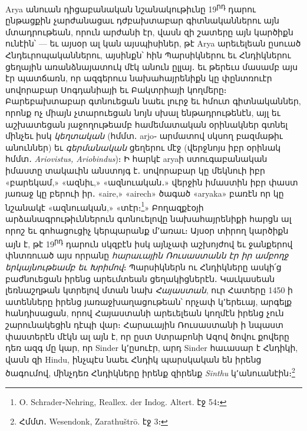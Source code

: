 \documentclass{article}
\begin{document}
{Arya անուան դիցաբանական նշանակութիւնը 19\textsuperscript{րդ} դարու ընթացքին չարժանացաւ դժբախտաբար գիտնականներու այն մտադրութեան, որուն արժանի էր, վասն զի շատերը այն կարծիքն ունէին՝ — եւ այսօր ալ կան այսպիսիներ, թէ Arya արեւելեան ըսուած Հնդեւրոպականներու, այսինքն՝ հին Պարսիկներու եւ Հնդիկներու ցեղային առանձնայատուկ մէկ անուն ըլլայ․ եւ թերեւս մասամբ այս էր պատճառն, որ ազգերուս նախահայրենիքն կը փընտռուէր սովորաբար Սոգդանիայի եւ Բակտրիայի կողմերը։ Բարեբախտաբար գտնուեցան նաեւ լուրջ եւ հմուտ գիտնականներ, որոնք ոչ միայն չտարուեցան նոյն սխալ ենթադրութենէն, այլ եւ աշխատեցան յաջողութեամբ համեմատական օրինակներ գտնել մինչեւ իսկ \emph{կեղտական} (հմմտ․ arjo֊ արմատով սկսող բազմաթիւ անուններ) եւ \emph{գերմանական} ցեղերու մէջ (վերջնոյս իբր օրինակ հմմտ․ \emph{Ariovistus, Ariobindus})։ Ի հարկէ aryaի ստուգաբանական իմաստը տակաւին անստոյգ է․ սովորաբար կը մեկնուի իբր «բարեկամ,» «ազնիւ,» «ազնուական․» վերջին իմաստին իբր փաստ յառաջ կը բերուի իր․ «aire,» «airech» ծագած «aryaka» բառէն որ կը նշանակէ «ազնուական,» «տէր։\footnote{O. Schrader֊Nehring, Reallex. der Indog. Altert. էջ 54։}» Բողազքէօյի արձանագրութիւններուն գտնուելովը նախահայրենիքի հարցն ալ որոշ եւ գոհացուցիչ կերպարանք մ՚առաւ։ Այսօր տիրող կարծիքն այն է, թէ 19\textsuperscript{րդ} դարուն սկզբէն իսկ այնչափ աշխոյժով եւ ջանքերով փնտռուած այս որրանը \emph{հարաւային Ռուսաստանն էր իր ամբողջ երկայնութեամբ եւ Խրիմով}։ Պարսիկներն ու Հնդիկները ասկի՛ց բաժնուեցան իրենց արեւմտեան ցեղակիցներէն․ Կաւկասեան լեռնաշղթան կտրելով մտան նախ \emph{Հայաստան}, ուր Հատերը 1450 ի ատենները իրենց յառաջխաղացութեան՝ որչափ կ՚երեւայ, արգելք հանդիսացան, որով Հայաստանի արեւելեան կողմէն իրենց չուն շարունակեցին դէպի վար։ Հարաւային Ռուսաստանի ի նպաստ փաստերէն մէկն ալ այն է, որ ըստ Ստրաբոնի Ազով ծովու քովերը դեռ ազգ մը կար, որ Sinder կ՚ըսուէր, արդ Sinder հաւասար է Հնդիկի, վասն զի Hindu, ինչպէս նաեւ Հնդիկ պարսկական են իրենց ծագումով, մինչդեռ Հնդիկները իրենք զիրենք \emph{Sinthu} կ՚անուանէին։\footnote{Հմմտ․ Wesendonk, Zarathuštrō. էջ 3։}

}
\end{document}

